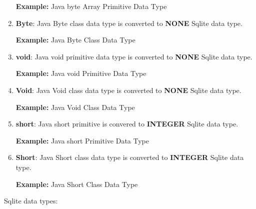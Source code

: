 \begin{enumerate}
		\par
		\textbf{Example:} Java byte Array Primitive Data Type
			

	\item \small \textbf{Byte}: Java Byte class data type is converted to \textbf{NONE} Sqlite data type.

		\par
		\textbf{Example:} Java Byte Class Data Type
			

	\item \small \textbf{void}: Java void primitive data type is converted to \textbf{NONE} Sqlite data type.

		\par
		\textbf{Example:} Java void Primitive Data Type
			

	\item \small \textbf{Void}: Java Void class data type is converted to \textbf{NONE} Sqlite data type.

		\par
		\textbf{Example:} Java Void Class Data Type
			

	\item \small \textbf{short}: Java short primitive is convered to \textbf{INTEGER} Sqlite data type.

		\par
		\textbf{Example:} Java short Primitive Data Type
			

	\item \small \textbf{Short}: Java Short class data type is converted to \textbf{INTEGER} Sqlite data type.
		
		\par
		\textbf{Example:} Java Short Class Data Type
			

\end{enumerate}


\par
Sqlite data types:
	
